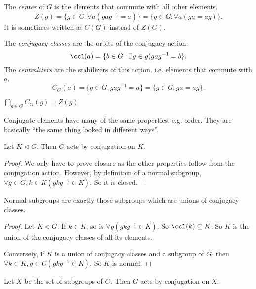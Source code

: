 \documentclass[a4paper]{article}
\begin{document}
  \begin{defi}
    The \emph{center} of $G$ is the elements that commute with all other elements.
    \[
      Z(g) = \{g\in G: \forall a(gag^{-1} = a)\} = \{g\in G: \forall a(ga = ag)\}.
    \]
    It is sometimes written as $C(G)$ instead of $Z(G)$.
  \end{defi}

  \begin{defi}
    The \emph{conjugacy classes} are the orbits of the conjugacy action.
    \[
      \ccl(a) = \{b\in G: \exists g\in g(gag^{-1} = b\}.
    \]
    The \emph{centralizers} are the stabilizers of this action, i.e. elements that commute with $a$.
    \[
      C_G(a) = \{g\in G: gag^{-1} = a\} = \{g\in G: ga = ag\}.
    \]
  \end{defi}

  \note $\bigcap_{g\in G} C_G(g) = Z(g)$

  \note Conjugate elements have many of the same properties, e.g. order. They are basically ``the same thing looked in different ways''.

  \begin{lemma}
    Let $K\lhd G$. Then $G$ acts by conjugation on $K$.
  \end{lemma}

  \begin{proof}
    We only have to prove closure as the other properties follow from the conjugation action. However, by definition of a normal subgroup, $\forall g\in G, k\in K(gkg^{-1}\in K)$.  So it is closed.
  \end{proof}

  \begin{prop}
    Normal subgroups are exactly those subgroups which are unions of conjugacy classes.
  \end{prop}

  \begin{proof}
    Let $K\lhd G$. If $k\in K$, so is $\forall g(gkg^{-1}\in K)$. So $\ccl(k)\subseteq K$. So $K$ is the union of the conjugacy classes of all its elements.

    Conversely, if $K$ is a union of conjugacy classes and a subgroup of $G$, then $\forall k\in K, g\in G(gkg^{-1}\in K)$. So $K$ is normal.
  \end{proof}

  \begin{lemma}
    Let $X$ be the set of subgroups of $G$. Then $G$ acts by conjugation on $X$. 
  \end{lemma}
\end{document}
